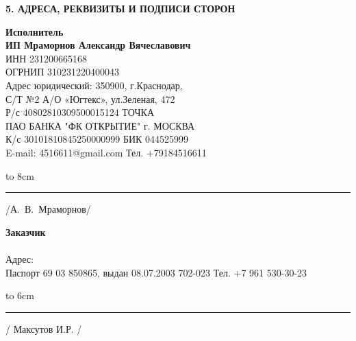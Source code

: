 \begin{center}
	\textbf{5. АДРЕСА, РЕКВИЗИТЫ И ПОДПИСИ СТОРОН}
\end{center}
\vspace{-6mm}
\noindent\parbox[l][5cm]{8cm}
{\begin{flushleft}
\small\textbf{Исполнитель\\ ИП Мраморнов Александр Вячеславович\\} 
\footnotesize {ИНН 231200665168\\
ОГРНИП 310231220400043}\\
\footnotesize{Адрес юридический: 350900, г.Краснодар,\\
С/Т №2 А/О «Югтекс», ул.Зеленая, 472\\
Р/с 40802810309500015124   ТОЧКА\\
ПАО БАНКА "ФК ОТКРЫТИЕ" г. МОСКВА\\
К/с 30101810845250000999 БИК   044525999\\
E-mail: 4516611@gmail.com  Тел. +79184516611 }
   	\end{flushleft}
  
\hbox to 8cm{\rule{40mm}{0.1mm} /А.~В.~Мраморнов/}}\hfill\parbox[l][5cm]{8cm}
 {
\begin{flushleft}
\small\textbf{Заказчик\\ \\} 
Адрес:\\
Паспорт 69 03 850865,  выдан 08.07.2003 702-023
Тел. +7 961 530-30-23\\ 
	\end{flushleft}
\vspace{18mm}
 	\hbox to 6cm{\rule{40mm}{0.1mm} / Максутов И.Р. /   }}
                                       
